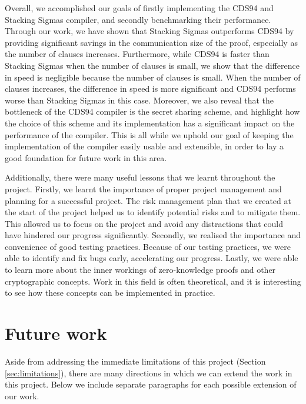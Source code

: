 Overall, we accomplished our goals of firstly implementing the CDS94 \cite{CDS94} and Stacking 
Sigmas \cite{StackingSigmas} compiler, and secondly benchmarking their performance. Through our 
work, we have shown that Stacking Sigmas outperforms CDS94 by providing significant savings in 
the communication size of the proof, especially as the number of clauses increases. 
Furthermore, while CDS94 is faster than Stacking Sigmas when the number of clauses is small,
we show that the difference in speed is negligible because the number of clauses is small. 
When the number of clauses increases, the difference in speed is more significant and CDS94 
performs worse than Stacking Sigmas in this case. Moreover, we also reveal that the bottleneck of the CDS94 compiler is the secret sharing scheme,
and highlight how the choice of this scheme and its implementation has a significant impact on the performance
of the compiler. This is all while we uphold our goal of keeping the implementation of the compiler
easily usable and extensible, in order to lay a good foundation for future work in this area. 

Additionally, there were many useful lessons that we learnt throughout the project. Firstly, we 
learnt the importance of proper project management and planning for a successful project. The 
risk management plan that we created at the start of the project helped us to identify potential
risks and to mitigate them. This allowed us to focus on the project and avoid any distractions
that could have hindered our progress significantly. Secondly, we realised the importance 
and convenience of good testing practices. Because of our testing practices, we were able to
identify and fix bugs early, accelerating our progress. Lastly, we were able to learn more about 
the inner workings of zero-knowledge proofs and other cryptographic concepts. Work in this field 
is often theoretical, and it is interesting to see how these concepts can be implemented in practice.

\section{Future work}\label{sec:futurework}
Aside from addressing the immediate limitations of this project (Section \ref{sec:limitations}), there are many directions in which we can extend the work in this project. Below we include separate paragraphs for each possible extension of our work. 


